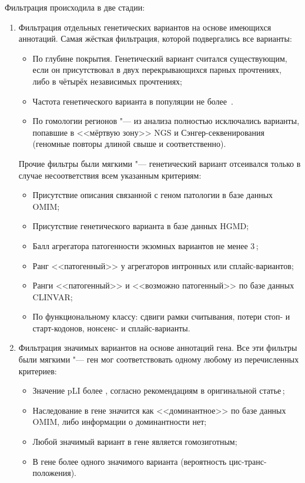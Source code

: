 \documentclass[a4paper,14pt]{extarticle}
\newcommand{\ecitep}[1]{\textenglish{\citep{#1}}}
\begin{document}
Фильтрация происходила в две стадии:
\begin{enumerate}
	\item Фильтрация отдельных генетических вариантов на основе имеющихся аннотаций.
	 Самая жёсткая фильтрация, которой подвергались все варианты:
	 \begin{itemize}
		 \item По глубине покрытия.
		 Генетический вариант считался существующим, если он присутствовал в двух перекрывающихся парных прочтениях, либо в чётырёх независимых прочтениях;
		 \item Частота генетического варианта в популяции не более \,\ecitep{Ryzhkova_2017}.
		 \item По гомологии регионов "--- из анализа полностью исключались варианты, попавшие в <<мёртвую зону>> NGS и Сэнгер-секвенирования (геномные повторы длиной свыше  и  соответственно).
	 \end{itemize}

	 Прочие фильтры были мягкими "--- генетический вариант отсеивался только в случае несоответствия всем указанным критериям:

	 \begin{itemize}
		 \item Присутствие описания связанной с геном патологии в базе данных OMIM;
		 \item Присутствие генетического варианта в базе данных HGMD;
		 \item Балл агрегатора патогенности экзомных вариантов не менее 3\,\ecitep{Ryzhkova_2017};
		 \item Ранг <<патогенный>> у агрегаторов интронных или сплайс-вариантов;
		 \item Ранги <<патогенный>> и <<возможно патогенный>> по базе данных CLINVAR;
		 \item По функциональному классу: сдвиги рамки считывания, потери стоп- и старт-кодонов, нонсенс- и сплайс-варианты.
	 \end{itemize}

	\item Фильтрация значимых вариантов на основе аннотаций гена.
	 Все эти фильтры были мягкими "--- ген мог соответствовать одному любому из перечисленных критериев:

	 \begin{itemize}
		 \item Значение pLI более , согласно рекомендациям в оригинальной статье\,\ecitep{Lek_2016};
		 \item Наследование в гене значится как <<доминантное>> по базе данных OMIM, либо информации о доминантности нет;
		 \item Любой значимый вариант в гене является гомозиготным;
		 \item В гене более одного значимого варианта (вероятность цис-транс-положения).
	 \end{itemize}
\end{enumerate}
\end{document}

